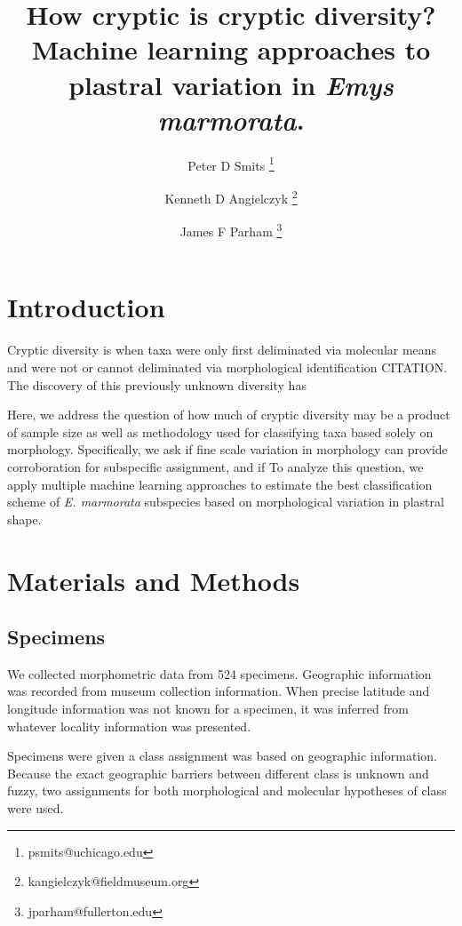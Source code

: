 \documentclass[12pt]{article}\usepackage{graphicx, color}
\title{How cryptic is cryptic diversity? Machine learning approaches to plastral variation in \textit{Emys marmorata}.}
\author[1]{Peter D Smits \thanks{psmits@uchicago.edu}}
\author[2]{Kenneth D Angielczyk \thanks{kangielczyk@fieldmuseum.org}}
\author[3]{James F Parham \thanks{jparham@fullerton.edu}}
\affil[1]{Committee on Evolution Biology, University of Chicago}
\affil[2]{Department of Geology, Field Museum of Natural History}
\affil[3]{Department of Geological Sciences, California State University -- Fullerton}
\begin{document}
\maketitle

\linenumbers
\modulolinenumbers[2]

\begin{abstract}

\end{abstract}

\section{Introduction}

Cryptic diversity is when taxa were only first deliminated via molecular means and were not or cannot deliminated via morphological identification CITATION. The discovery of this previously unknown diversity has 


Here, we address the question of how much of cryptic diversity may be a product of sample size as well as methodology used for classifying taxa based solely on morphology. Specifically, we ask if fine scale variation in morphology can provide corroboration for subspecific assignment, and if 
To analyze this question, we apply multiple machine learning approaches to estimate the best classification scheme of \textit{E. marmorata} subspecies based on morphological variation in plastral shape. 




\section{Materials and Methods}
\subsection{Specimens}
We collected morphometric data from 524 specimens. Geographic information was recorded from museum collection information. When precise latitude and longitude information was not known for a specimen, it was inferred from whatever locality information was presented.

Specimens were given a class assignment was based on geographic information. Because the exact geographic barriers between different class is unknown and fuzzy, two assignments for both morphological and molecular hypotheses of class were used. 
\end{document}
